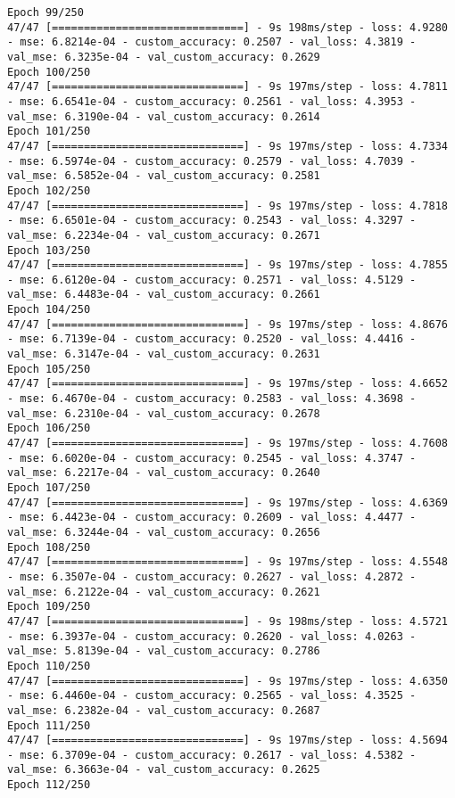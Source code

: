 \begin{lstlisting}
Epoch 99/250
47/47 [==============================] - 9s 198ms/step - loss: 4.9280 - mse: 6.8214e-04 - custom_accuracy: 0.2507 - val_loss: 4.3819 - val_mse: 6.3235e-04 - val_custom_accuracy: 0.2629
Epoch 100/250
47/47 [==============================] - 9s 197ms/step - loss: 4.7811 - mse: 6.6541e-04 - custom_accuracy: 0.2561 - val_loss: 4.3953 - val_mse: 6.3190e-04 - val_custom_accuracy: 0.2614
Epoch 101/250
47/47 [==============================] - 9s 197ms/step - loss: 4.7334 - mse: 6.5974e-04 - custom_accuracy: 0.2579 - val_loss: 4.7039 - val_mse: 6.5852e-04 - val_custom_accuracy: 0.2581
Epoch 102/250
47/47 [==============================] - 9s 197ms/step - loss: 4.7818 - mse: 6.6501e-04 - custom_accuracy: 0.2543 - val_loss: 4.3297 - val_mse: 6.2234e-04 - val_custom_accuracy: 0.2671
Epoch 103/250
47/47 [==============================] - 9s 197ms/step - loss: 4.7855 - mse: 6.6120e-04 - custom_accuracy: 0.2571 - val_loss: 4.5129 - val_mse: 6.4483e-04 - val_custom_accuracy: 0.2661
Epoch 104/250
47/47 [==============================] - 9s 197ms/step - loss: 4.8676 - mse: 6.7139e-04 - custom_accuracy: 0.2520 - val_loss: 4.4416 - val_mse: 6.3147e-04 - val_custom_accuracy: 0.2631
Epoch 105/250
47/47 [==============================] - 9s 197ms/step - loss: 4.6652 - mse: 6.4670e-04 - custom_accuracy: 0.2583 - val_loss: 4.3698 - val_mse: 6.2310e-04 - val_custom_accuracy: 0.2678
Epoch 106/250
47/47 [==============================] - 9s 197ms/step - loss: 4.7608 - mse: 6.6020e-04 - custom_accuracy: 0.2545 - val_loss: 4.3747 - val_mse: 6.2217e-04 - val_custom_accuracy: 0.2640
Epoch 107/250
47/47 [==============================] - 9s 197ms/step - loss: 4.6369 - mse: 6.4423e-04 - custom_accuracy: 0.2609 - val_loss: 4.4477 - val_mse: 6.3244e-04 - val_custom_accuracy: 0.2656
Epoch 108/250
47/47 [==============================] - 9s 197ms/step - loss: 4.5548 - mse: 6.3507e-04 - custom_accuracy: 0.2627 - val_loss: 4.2872 - val_mse: 6.2122e-04 - val_custom_accuracy: 0.2621
Epoch 109/250
47/47 [==============================] - 9s 198ms/step - loss: 4.5721 - mse: 6.3937e-04 - custom_accuracy: 0.2620 - val_loss: 4.0263 - val_mse: 5.8139e-04 - val_custom_accuracy: 0.2786
Epoch 110/250
47/47 [==============================] - 9s 197ms/step - loss: 4.6350 - mse: 6.4460e-04 - custom_accuracy: 0.2565 - val_loss: 4.3525 - val_mse: 6.2382e-04 - val_custom_accuracy: 0.2687
Epoch 111/250
47/47 [==============================] - 9s 197ms/step - loss: 4.5694 - mse: 6.3709e-04 - custom_accuracy: 0.2617 - val_loss: 4.5382 - val_mse: 6.3663e-04 - val_custom_accuracy: 0.2625
Epoch 112/250

\end{lstlisting}
